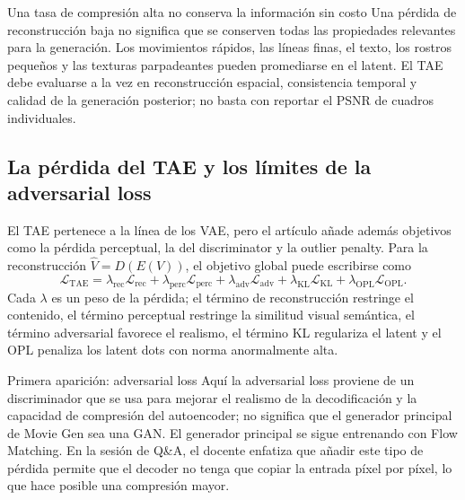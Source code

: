 \documentclass[a4paper]{article}
\begin{document}
\begin{warningbox}{Una tasa de compresión alta no conserva la información sin costo}
Una pérdida de reconstrucción baja no significa que se conserven todas las propiedades relevantes para la generación. Los movimientos rápidos, las líneas finas, el texto, los rostros pequeños y las texturas parpadeantes pueden promediarse en el latent. El TAE debe evaluarse a la vez en reconstrucción espacial, consistencia temporal y calidad de la generación posterior; no basta con reportar el PSNR de cuadros individuales.
\end{warningbox}

\subsection{La pérdida del TAE y los límites de la adversarial loss}

El TAE pertenece a la línea de los VAE, pero el artículo añade además objetivos como la pérdida perceptual, la del discriminator y la outlier penalty. Para la reconstrucción $\hat V=D(E(V))$, el objetivo global puede escribirse como
\[
\mathcal L_{\mathrm{TAE}}
=\lambda_{\mathrm{rec}}\mathcal L_{\mathrm{rec}}
+\lambda_{\mathrm{perc}}\mathcal L_{\mathrm{perc}}
+\lambda_{\mathrm{adv}}\mathcal L_{\mathrm{adv}}
+\lambda_{\mathrm{KL}}\mathcal L_{\mathrm{KL}}
+\lambda_{\mathrm{OPL}}\mathcal L_{\mathrm{OPL}}.
\]
Cada $\lambda$ es un peso de la pérdida; el término de reconstrucción restringe el contenido, el término perceptual restringe la similitud visual semántica, el término adversarial favorece el realismo, el término KL regulariza el latent y el OPL penaliza los latent dots con norma anormalmente alta.

\begin{knowledgebox}{Primera aparición: adversarial loss}
Aquí la adversarial loss proviene de un discriminador que se usa para mejorar el realismo de la decodificación y la capacidad de compresión del autoencoder; no significa que el generador principal de Movie Gen sea una GAN. El generador principal se sigue entrenando con Flow Matching. En la sesión de Q\&A, el docente enfatiza que añadir este tipo de pérdida permite que el decoder no tenga que copiar la entrada píxel por píxel, lo que hace posible una compresión mayor.
\end{knowledgebox}

\end{document}
